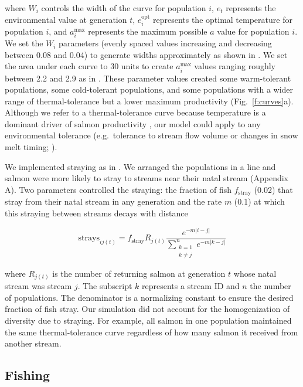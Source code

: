 \documentclass[12pt,english]{article}
\newcommand{\somstray}{Appendix A}
\begin{document}
\begin{spacing}{1.3}
\noindent
where $W_i$ controls the width of the curve for population $i$, $e_t$ represents the environmental value at generation $t$, $e_i^{\mathrm{opt}}$ represents the optimal temperature for population $i$, and $a_i^{\mathrm{max}}$ represents the maximum possible $a$ value for population $i$. We set the $W_i$ parameters (evenly spaced values increasing and decreasing between 0.08 and 0.04) to generate widths approximately as shown in \citet{eliason2011}. We set the area under each curve to 30 units to create $a_i^{\mathrm{max}}$ values ranging roughly between 2.2 and 2.9 as in \citet{dorner2008}. These parameter values created some warm-tolerant populations, some cold-tolerant populations, and some populations with a wider range of thermal-tolerance but a lower maximum productivity (Fig.~\ref{f:curves}a). Although we refer to a thermal-tolerance curve because temperature is a dominant driver of salmon productivity \citep[e.g.][]{mccullough1999, patterson2007, eliason2011}, our model could apply to any environmental tolerance (e.g.~tolerance to stream flow volume or changes in snow melt timing; \citeauthor{crozier2008} \citeyear{crozier2008}).

We implemented straying as in \citet{cooper1999}. We arranged the populations in a line and salmon were more likely to stray to streams near their natal stream (\somstray). Two parameters controlled the straying: the fraction of fish $f_{\mathrm{stray}}$ (0.02) that stray from their natal stream in any generation and the rate $m$ (0.1) at which this straying between streams decays with distance

\[\mathrm{strays}_{ij(t)} = f_{\mathrm{stray}} R_{j(t)} \frac{e^{-m \lvert i-j
\rvert }} {\displaystyle\sum\limits_{ \substack{k = 1 \\ k \neq j}}^{n} e^{-m
\lvert k-j \rvert }}\]

\noindent
where $R_{j(t)}$ is the number of returning salmon at generation $t$ whose natal stream was stream $j$. The subscript $k$ represents a stream ID and $n$ the number of populations. The denominator is a normalizing constant to ensure the desired fraction of fish stray. Our simulation did not account for the homogenization of diversity due to straying. For example, all salmon in one population maintained the same thermal-tolerance curve regardless of how many salmon it received from another stream.

\subsection{Fishing}\label{fishing}


\end{spacing}
\end{document}
